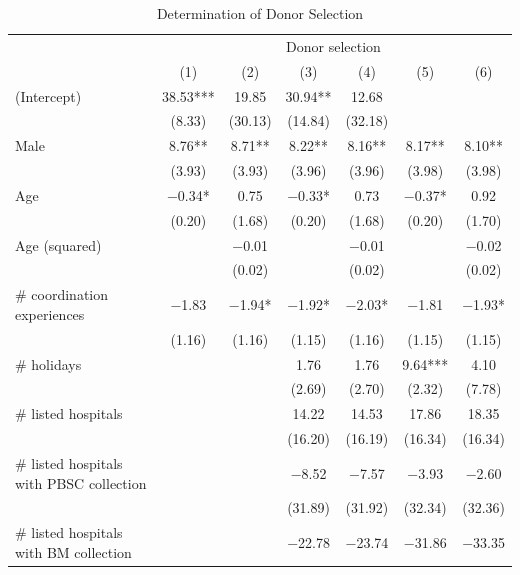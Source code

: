 \documentclass[12pt, a4paper]{article}
\begin{document}
\begin{table}[H]

\caption{\label{tab:lm-who-selected}Determination of Donor Selection}
\centering
\fontsize{8}{10}\selectfont
\begin{threeparttable}
\begin{tabular}[t]{lcccccc}
\toprule
\multicolumn{1}{c}{ } & \multicolumn{6}{c}{Donor selection} \\
\cmidrule(l{3pt}r{3pt}){2-7}
  & (1) & (2) & (3) & (4) & (5) & (6)\\
\midrule
(Intercept) & \num{38.53}*** & \num{19.85} & \num{30.94}** & \num{12.68} &  & \\
 & (\num{8.33}) & (\num{30.13}) & (\num{14.84}) & (\num{32.18}) &  & \\
Male & \num{8.76}** & \num{8.71}** & \num{8.22}** & \num{8.16}** & \num{8.17}** & \num{8.10}**\\
 & (\num{3.93}) & (\num{3.93}) & (\num{3.96}) & (\num{3.96}) & (\num{3.98}) & (\num{3.98})\\
Age & \num{-0.34}* & \num{0.75} & \num{-0.33}* & \num{0.73} & \num{-0.37}* & \num{0.92}\\
 & (\num{0.20}) & (\num{1.68}) & (\num{0.20}) & (\num{1.68}) & (\num{0.20}) & (\num{1.70})\\
Age (squared) &  & \num{-0.01} &  & \num{-0.01} &  & \num{-0.02}\\
 &  & (\num{0.02}) &  & (\num{0.02}) &  & (\num{0.02})\\
\# coordination experiences & \num{-1.83} & \num{-1.94}* & \num{-1.92}* & \num{-2.03}* & \num{-1.81} & \num{-1.93}*\\
 & (\num{1.16}) & (\num{1.16}) & (\num{1.15}) & (\num{1.16}) & (\num{1.15}) & (\num{1.15})\\
\# holidays &  &  & \num{1.76} & \num{1.76} & \num{9.64}*** & \num{4.10}\\
 &  &  & (\num{2.69}) & (\num{2.70}) & (\num{2.32}) & (\num{7.78})\\
\# listed hospitals &  &  & \num{14.22} & \num{14.53} & \num{17.86} & \num{18.35}\\
 &  &  & (\num{16.20}) & (\num{16.19}) & (\num{16.34}) & (\num{16.34})\\
\# listed hospitals with PBSC collection &  &  & \num{-8.52} & \num{-7.57} & \num{-3.93} & \num{-2.60}\\
 &  &  & (\num{31.89}) & (\num{31.92}) & (\num{32.34}) & (\num{32.36})\\
\# listed hospitals with BM collection &  &  & \num{-22.78} & \num{-23.74} & \num{-31.86} & \num{-33.35}\\

\end{tabular}
\end{threeparttable}
\end{table}
\end{document}
